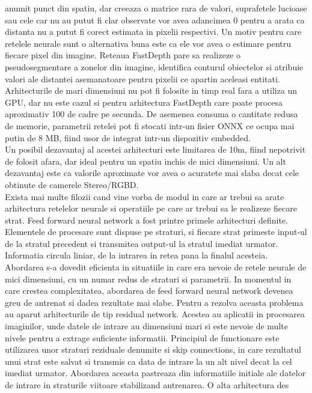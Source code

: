 \documentclass[12pt,a4paper]{report}
\begin{document}
anumit punct din spatiu, dar creeaza o matrice rara de valori, suprafetele lucioase sau 
cele car nu au putut fi clar observate vor avea adancimea 0 pentru a arata ca distanta nu a putut 
fi corect estimata in pixelii respectivi. Un motiv pentru care retelele
neurale sunt o alternativa buna este ca ele vor avea o estimare pentru fiecare pixel din imagine.
Reteaua FastDepth pare sa realizeze o pseudosegmentare a zonelor din imagine, identifica
conturul obiectelor si atribuie valori ale distantei asemanatoare pentru pixelii ce apartin aceleasi
entitati. Arhitecturile de mari dimensiuni nu pot fi folosite in timp real 
fara a utiliza un GPU, dar nu este cazul si pentru arhitectura FastDepth care poate procesa 
aproximativ 100 de cadre pe secunda. De asemenea consuma o cantitate redusa de memorie,  
parametrii retelei pot fi stocati intr-un fisier ONNX ce ocupa mai putin de 8 MB, fiind usor
de integrat intr-un dispozitiv embedded. \\
Un posibil dezavantaj al acestei arhitecturi este limitarea de 10m, fiind nepotrivit
de folosit afara, dar ideal pentru un spatiu inchis de mici dimensiuni. Un alt dezavantaj
este ca valorile aproximate vor avea o acuratete mai slaba decat cele obtinute de camerele
Stereo/RGBD.\\
Exista mai multe filozii cand vine vorba de modul in care ar trebui sa
arate arhitectura retelelor neurale si operatiile pe care ar trebui sa le realizeze
fiecare strat. Feed forward neural network a fost printre primele arhitecturi definite. 
Elementele de procesare sunt dispuse pe straturi, si fiecare strat primeste input-ul de la stratul 
precedent si transmitea output-ul la stratul imediat urmator. Informatia circula liniar, de la 
intrarea in retea pana la finalul acesteia. Abordarea s-a dovedit eficienta in situatiile 
in care era nevoie de retele neurale de mici dimensiuni, cu un numar redus de straturi si 
parametrii. In momentul in care crestea complexitatea, abordarea de feed forward neural network 
devenea greu de antrenat si dadea rezultate mai slabe. Pentru a rezolva aceasta problema 
au aparut arhitecturile de tip residual network. Acestea au aplicatii in procesarea imaginilor,
unde datele de intrare au dimensiuni mari si este nevoie de multe nivele pentru a extrage
suficiente informatii. Principiul de functionare este utilizarea unor straturi reziduale 
denumite si skip connections, in care rezultatul unui strat este salvat si transmis ca data de
intrare la un alt nivel decat la cel imediat urmator. Abordarea aceasta pastreaza din informatiile initiale ale 
datelor de intrare in straturile viitoare stabilizand antrenarea. O alta arhitectura des 
\end{document}
